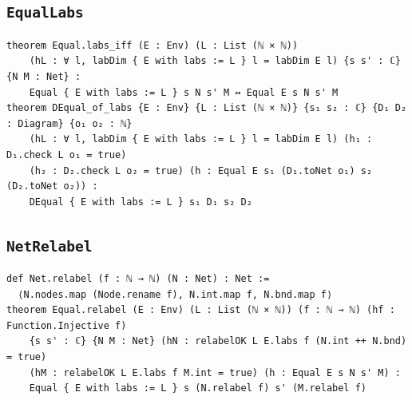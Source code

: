 \subsection{\texttt{EqualLabs}}
\begin{lstlisting}[style=leancore]
theorem Equal.labs_iff (E : Env) (L : List (ℕ × ℕ))
    (hL : ∀ l, labDim { E with labs := L } l = labDim E l) {s s' : ℂ} {N M : Net} :
    Equal { E with labs := L } s N s' M ↔ Equal E s N s' M
theorem DEqual_of_labs {E : Env} {L : List (ℕ × ℕ)} {s₁ s₂ : ℂ} {D₁ D₂ : Diagram} {o₁ o₂ : ℕ}
    (hL : ∀ l, labDim { E with labs := L } l = labDim E l) (h₁ : D₁.check L o₁ = true)
    (h₂ : D₂.check L o₂ = true) (h : Equal E s₁ (D₁.toNet o₁) s₂ (D₂.toNet o₂)) :
    DEqual { E with labs := L } s₁ D₁ s₂ D₂
\end{lstlisting}

\subsection{\texttt{NetRelabel}}
\begin{lstlisting}[style=leancore]
def Net.relabel (f : ℕ → ℕ) (N : Net) : Net :=
  ⟨N.nodes.map (Node.rename f), N.int.map f, N.bnd.map f⟩
theorem Equal.relabel (E : Env) (L : List (ℕ × ℕ)) (f : ℕ → ℕ) (hf : Function.Injective f)
    {s s' : ℂ} {N M : Net} (hN : relabelOK L E.labs f (N.int ++ N.bnd) = true)
    (hM : relabelOK L E.labs f M.int = true) (h : Equal E s N s' M) :
    Equal { E with labs := L } s (N.relabel f) s' (M.relabel f)
\end{lstlisting}

